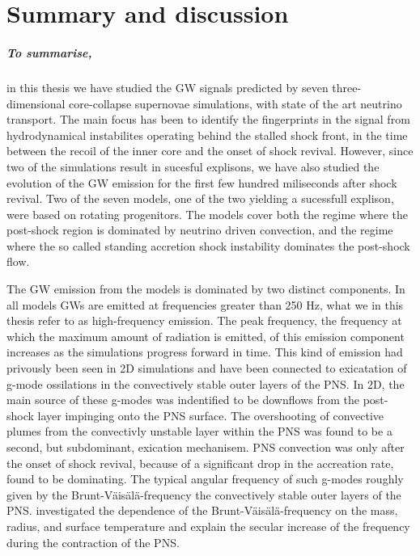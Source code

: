 \chapter{Summary and discussion}
\paragraph{To summarise,}
in this thesis we have studied the GW signals predicted
by seven three-dimensional core-collapse supernovae simulations, with state of the art 
neutrino transport. The main focus has been to identify the fingerprints in the signal
from hydrodynamical instabilites operating behind the stalled shock front, in the time between the
recoil of the inner core and the onset of shock revival. However, since two of the simulations
result in sucesful explisons, we have also studied the evolution of the GW emission
for the first few hundred miliseconds after shock revival. Two of the seven models, one of the two
yielding a sucessfull explison, were based on rotating progenitors. The models cover both the
regime where the post-shock region is dominated by neutrino driven convection, and the regime where
the so called standing accretion shock instability dominates the post-shock flow.

The GW emission from the models is dominated by two distinct components. In all models
GWs are emitted at frequencies greater than 250 Hz, what we in this thesis refer to as 
high-frequency emission. The peak frequency, the frequency at which the maximum amount of radiation 
is emitted, of this emission component increases as the simulations progress forward in time. 
This kind of emission had privously been seen in 2D simulations \citep{marek_08,murphy_09,mueller_13}
and have been connected to exicatation of g-mode ossilations in the convectively stable outer layers of the PNS.
In 2D, the main source of these g-modes was indentified to be downflows from the post-shock layer impinging onto the PNS surface.
The overshooting of convective plumes from the convectivly unstable layer within the PNS was found to be a second, but subdominant, exication
mechanisem. PNS convection was only after the onset of shock revival, because of a significant drop in the accreation rate, found to 
be dominating.  The typical angular frequency of such g-modes roughly given by the Brunt-V\"{a}is\"{a}l\"{a}-frequency
the convectively stable outer layers of the PNS. \citet{mueller_13} investigated the dependence
of the Brunt-V\"{a}is\"{a}l\"{a}-frequency on the mass, radius, and surface temperature and explain the secular
increase of the frequency during the contraction of the PNS.


